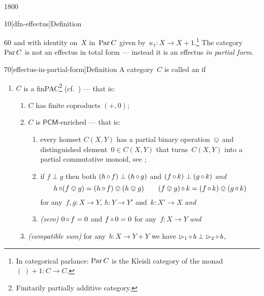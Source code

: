 \begin{parsec}{1800}
\begin{point}{10}[dfn-effectus]{Definition}
\begin{point}{60}
    and with identity on~$X$ in~$\operatorname{Par} C$
    given by~$\kappa_1 \colon X \to X+1$.\footnote{In categorical
            parlance: $\operatorname{Par} C$ is the Kleisli category of
            the monad~$(\ )+1\colon C \to C$.}
The category~$\operatorname{Par} C$ is not an effectus in total form --- instead it
    is an effectus \emph{in partial form}.
\end{point}
\end{point}
\begin{point}{70}[effectus-in-partial-form]{Definition}%
A category~$C$ is called an 
    \cite{effintro,kentapartial} if
\begin{enumerate}
\item
    $C$ is a finPAC\footnote{Finitarily partially additive category.} \cite{kentapartial} (cf.~\cite{arbib}) --- that is:
    \begin{enumerate}
        \item 
            $C$ has finite coproducts $(+,0)$;
        \item $C$ is $\mathsf{PCM}$-enriched --- that is:
            \begin{enumerate}
            \item
            every homset $C(X,Y)$ has a partial binary operation~$\ovee$
                    and distinguished element~$0 \in C(X,Y)$
                    that turns~$C(X,Y)$ into a partial commutative monoid,
                    see ;
            \item
            if $f \perp g$ then both
                $(h \mathop{\circ} f) \perp (h \mathop{\circ} g)$ and
                $(f \mathop{\circ} k) \perp (g \mathop{\circ} k)$ \emph{and}
            \begin{equation*}
                 h \mathop{\circ} (f \ovee g) = 
                (h \mathop{\circ} f) \ovee (h \ovee g)\qquad
                (f \ovee g) \mathop{\circ} k = 
                (f \mathop{\circ} k) \ovee (g \mathop{\circ} k)
            \end{equation*}
                for any~$f,g \colon X \to Y$,
                $h\colon Y \to Y'$
                    and~$k \colon X'\to X$ \emph{and}
            \item
                \emph{(zero)}
                $0 \mathop{\circ} f = 0$ and $f \mathop{\circ} 0 = 0$ for
                    any~$f\colon X \to Y$ \emph{and}
            \end{enumerate}
        \item
            \emph{(compatible sum)}
            for any~$b\colon X \to Y + Y$ we have
            $\mathord{\vartriangleright}_1 \mathop{\circ} b \perp \mathord{\vartriangleright}_2 \mathop{\circ} b$,

\end{enumerate}
\end{enumerate}
\end{point}
\end{parsec}

